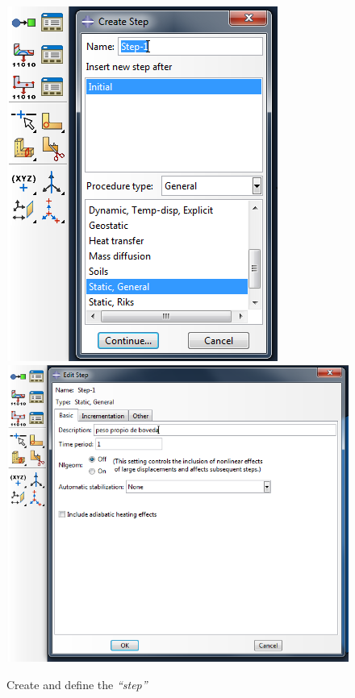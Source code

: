 \documentclass[english,a4paper,12pt]{article}
\begin{document}
\begin{figure}[h!tp]
\centering
\subfigure[Creation]%
{\includegraphics[scale=0.4]{capturas/15-step.png}}
\subfigure[Definition]%
{\includegraphics[scale=0.4]{capturas/16-step.png}}
\caption{Create and define the \emph{``step''}}
\label{fig:step}
\end{figure}
\end{document}

